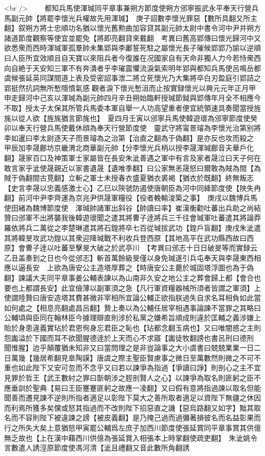 <br />
　　都知兵馬使渾瑊同平章事兼朔方節度使朔方邠寧振武永平奉天行營兵馬副元帥【將罷李懷光兵權故先用渾瑊】　庚子詔數李懷光罪惡【數所具翻又所主翻】叙朔方將士忠順功名猶以懷光舊勲曲加容貸其副元帥太尉中書令河中尹并朔方諸道節度觀察等使宜並罷免【將即亮翻貸來戴翻　考異曰舊高郢傳曰懷光歸河中又欲悉衆而西時渾瑊軍孤羣帥未集郢與李鄘誓死駐之屬懷光長子璀候郢郢乃諭以逆順曰人臣所宜效順且自天寶以來阻兵者今復誰在况國家自有天命非獨人力今若恃衆西向自絶于天安知三軍不有奔潰者乎李璀震懼流淚氣索明年郢與都知兵馬使呂鳴岳都虞候張延英同謀間道上表及受密詔事泄二將立死懷光乃大集將卒白刃盈庭引郢詰之郢挺然抗詞無所慙隱憤氣感觀者淚下懷光慙沮而止按實録懷光以興元元年正月甲申走歸河中己亥以渾瑊為副元帥四月辛丑朔始臨軒授瑊節鉞與郢傳年月全不相應今不取】授太子太保其所管兵馬委本軍自舉一人功高望重者便宜統領速具奏聞當授旌旄以從人欲【旌旄猶言節旄也】　夏四月壬寅以邠寧兵馬使韓遊瓌為邠寧節度使癸卯以奉天行營兵馬使戴休顔為奉天行營節度使　靈武守將甯景璿為李懷光治第别將李如暹曰李太尉逐天子而景璿為之治第【治直之翻為于偽翻】是亦反也攻而殺之　甲辰加李晟鄜坊京畿渭北商華副元帥【分李懷光兵柄以授李晟渾瑊鄜音夫華戶化翻】晟家百口及神策軍士家屬皆在長安朱泚善遇之軍中有言及家者晟泣曰天子何在敢言家乎泚使晟親近以家書遺晟【遺唯季翻】曰公家無恙晟怒曰爾敢為賊為間【為賊于偽翻間古莧翻】立斬之軍士未授春衣盛夏猶衣裘褐【猶衣於既翻】終無叛志【史言李晟以忠義感激士心】乙巳以陝虢防遏使唐朝臣為河中同絳節度使【陜失冉翻】前河中尹李齊運為京兆尹供晟軍糧役【役者輓輸浚築之事】　庚戌以魏博兵馬使田緒為魏博節度使　渾瑊帥諸軍出斜谷【帥讀曰率】崔漢衡勸吐蕃出兵助之尚結贊曰邠軍不出將襲我後韓遊瓌聞之遣其將曹子逹將兵三千往會瑊軍吐蕃遣其將論莽羅依將兵二萬從之李楚琳遣其將石鍠將卒七百從瑊拔武功【鍠戶盲翻】庚戌朱泚遣其將韓旻攻武功鍠以其衆迎降瑊戰不利收兵登西原【其地高平在武功縣西故曰西原】會曹子逹以吐蕃至擊旻大破之於武亭川　【考異曰邠志十日日破旻等而實録云乙丑盖奏到之日也今從邠志】斬首萬餘級旻僅以身免瑊遂引兵屯奉天與李晟東西相應以逼長安　上欲為唐安公主造塔厚葬之【時唐安公主薨於城固塔浮圖也為于偽翻】諫議大夫同平章事姜公輔表諫以為山南非久安之地公主之葬會歸上都【會合也要也上都謂長安】此宜儉薄以副軍須之急【凡行軍資糧器械所須者皆謂之軍須】上使謂陸贄曰唐安造塔其費甚微非宰相所宜論公輔正欲指朕過失自求名耳相負如此當如何處之【相息亮翻處昌呂翻】贄上奏以為公輔任居宰相遇事論諫不當罪之其略曰公輔頃與臣同在翰林臣今據理辯直則涉於私黨之嫌希旨順成則違於匡輔之義涉嫌上貽於身患違義實玷於君恩徇身忘君臣之恥也【玷都念翻玉病也】又曰唯闇惑之主則怨讟溢於下國而耳不欲聞腥德逹於上天而心不求寤【讟徒牧翻謗也書呂刑曰德刑聞惟腥】迨乎顛覆猶未知非又曰當問理之是非豈論事之大小虞書曰兢兢業業一日二日萬幾【幾居希翻見臯陶謨】唐虞之際主聖臣賢慮事之微日至萬數然則微之不可不重也如此陛下又安可忽而不念乎又曰若以諫爭為指過【爭讀曰諍】則剖心之主不宜見罪於哲王【武王數紂之罪曰斮朝涉之脛剖賢人之心】以諫爭為取名則匪躬之臣不應垂訓於聖典【易曰王臣蹇蹇匪躬之故應一凌翻】又曰假有意將指過諫以取名但能聞善而遷見諫不逆則所指者適足以彰陛下莫大之善所取者適足以資陛下無疆之休因而利焉所獲多矣儻或怒其指過而不改則陛下招惡直之譏【惡烏路翻又如字】黜其取名而不容則陛下被違諫之謗【被皮義翻】是乃掩己過而過彌著損彼名而名益彰果而行之所失大矣上意猶怒甲寅罷公輔爲左庶子加西川節度使張延賞同平章事賞其供億無乏故也【上在漢中藉西川供億為張延賞入相張本上時掌翻使疏吏翻】　朱泚姚令言數遣人誘涇原節度使馮河清【泚且禮翻又音此數所角翻誘